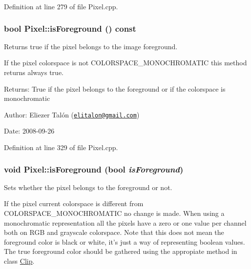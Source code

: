 Definition at line 279 of file Pixel.cpp.\hypertarget{class_pixel_48f2d29f9542f9c2ce293422ab07ffcc}{
\subsubsection[isForeground]{\setlength{\rightskip}{0pt plus 5cm}bool Pixel::isForeground () const}}
\label{class_pixel_48f2d29f9542f9c2ce293422ab07ffcc}


Returns true if the pixel belongs to the image foreground. 

If the pixel colorspace is not COLORSPACE\_\-MONOCHROMATIC this method returns always true.

\begin{Desc}
\item[Returns:]True if the pixel belongs to the foreground or if the colorspace is monochromatic\end{Desc}
\begin{Desc}
\item[Author:]Eliezer Talón (\href{mailto:elitalon@gmail.com}{\tt elitalon@gmail.com}) \end{Desc}
\begin{Desc}
\item[Date:]2008-09-26 \end{Desc}


Definition at line 329 of file Pixel.cpp.\hypertarget{class_pixel_1b1d5b2ed9285b837d85c33f09cab3f9}{
\subsubsection[isForeground]{\setlength{\rightskip}{0pt plus 5cm}void Pixel::isForeground (bool {\em isForeground})}}
\label{class_pixel_1b1d5b2ed9285b837d85c33f09cab3f9}


Sets whether the pixel belongs to the foreground or not. 

If the pixel current colorspace is different from COLORSPACE\_\-MONOCHROMATIC no change is made. When using a monochromatic representation all the pixels have a zero or one value per channel both on RGB and grayscale colorspace. Note that this does not mean the foreground color is black or white, it's just a way of representing boolean values. The true foreground color should be gathered using the appropiate method in class \hyperlink{class_clip}{Clip}.

